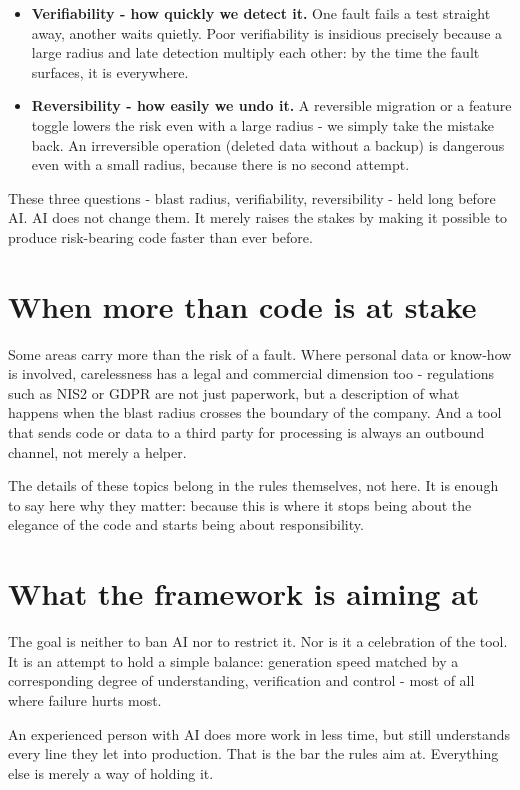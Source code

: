 \begin{itemize}
\item \textbf{Verifiability - how quickly we detect it.}
One fault fails a test straight away, another waits quietly.
Poor verifiability is insidious precisely because a large radius and late detection multiply each other: by the time the fault surfaces, it is everywhere.
\item \textbf{Reversibility - how easily we undo it.}
A reversible migration or a feature toggle lowers the risk even with a large radius - we simply take the mistake back.
An irreversible operation (deleted data without a backup) is dangerous even with a small radius, because there is no second attempt.
\end{itemize}

These three questions - blast radius, verifiability, reversibility - held long before AI.
AI does not change them.
It merely raises the stakes by making it possible to produce risk-bearing code faster than ever before.

\section{When more than code is at stake}

Some areas carry more than the risk of a fault.
Where personal data or know-how is involved, carelessness has a legal and commercial dimension too - regulations such as NIS2 or GDPR are not just paperwork, but a description of what happens when the blast radius crosses the boundary of the company.
And a tool that sends code or data to a third party for processing is always an outbound channel, not merely a helper.

The details of these topics belong in the rules themselves, not here.
It is enough to say here why they matter: because this is where it stops being about the elegance of the code and starts being about responsibility.

\section{What the framework is aiming at}

The goal is neither to ban AI nor to restrict it.
Nor is it a celebration of the tool.
It is an attempt to hold a simple balance: generation speed matched by a corresponding degree of understanding, verification and control - most of all where failure hurts most.

An experienced person with AI does more work in less time, but still understands every line they let into production.
That is the bar the rules aim at.
Everything else is merely a way of holding it.

